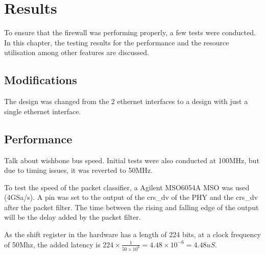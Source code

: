 
\chapter[Results]{Results}
\label{Chap:label}	%
\pagestyle{headings}


To ensure that the firewall was performing properly, a few tests were conducted. In this chapter, the testing results for the performance and the resource utilisation among other features are discussed. 

\section{Modifications}
The design was changed from the 2 ethernet interfaces to a design with just a single ethernet interface. 

\section{Performance}

Talk about wishbone bus speed. 
Initial tests were also conducted at 100MHz, but due to timing issues, it was reverted to 50MHz.


To test the speed of the packet classifier, a Agilent MSO6054A MSO was used (4GSa/s). A pin was set to the output of the crs\_dv of the PHY and the crs\_dv after the packet filter. The time between the rising and falling edge of the output will be the delay added by the packet filter. 


As the shift register in the hardware has a length of 224 bits, at a clock frequency of 50Mhz, the added latency is $224 \times \frac{1}{50\times 10^6} = 4.48 \times 10^{-6} = 4.48uS$. 


